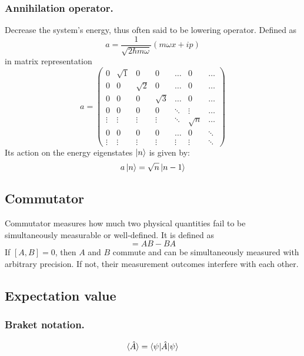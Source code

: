 \documentclass[../../../main.tex]{subfiles}
\begin{document}
\subsubsection*{Annihilation operator.} Decrease the system's energy, thus often said to be lowering operator. Defined as
\begin{equation*}
    a = \frac{1}{\sqrt{2\hbar m \omega}} \left( m\omega x + i p \right)
\end{equation*}
in matrix representation
\begin{equation*}
    a=\begin{pmatrix}
        0 & \sqrt{1} & 0 & 0 & \dots & 0 & \dots \\
        0 & 0 & \sqrt{2} & 0 & \dots & 0 & \dots \\
        0 & 0 & 0 & \sqrt{3} & \dots & 0 & \dots \\
        0 & 0 & 0 & 0 & \ddots & \vdots & \dots \\
        \vdots & \vdots & \vdots & \vdots & \ddots & \sqrt{n} & \dots \\
        0 & 0 & 0 & 0 & \dots & 0 & \ddots \\
        \vdots & \vdots & \vdots & \vdots & \vdots & \vdots & \ddots 
    \end{pmatrix}
\end{equation*}
Its action on the energy eigenstates $\ket{n}$ is given by:
\begin{equation*}
    a \ket{n} = \sqrt{n} \ket{n-1}
\end{equation*}

\subsection*{Commutator}
Commutator measures how much two physical quantities fail to be simultaneously measurable or well-defined. It is defined as 
\begin{equation*}
    [A,B]=AB-BA
\end{equation*}
If $[A,B]=0$, then $A$ and $B$ commute and can be simultaneously measured with arbitrary precision. If not, their measurement outcomes interfere with each other.

\subsection*{Expectation value}
\subsubsection*{Braket notation.}
\begin{equation*}
    \braket{\hat{A}}=\braket{\psi|\hat{A}|\psi}
\end{equation*}
\end{document}
